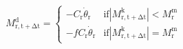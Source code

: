 \documentclass[12pt]{article}
\begin{document}
\begin{align}
 M_\mathrm{r,t+\Delta t}^\mathrm{d} = \left\lbrace \begin{array}{cl}
 -C_\mathrm{r} \dot{\theta}_\mathrm{r} & \mathrm{if } |M_\mathrm{r,t+\Delta t}^\mathrm{k}| < M_\mathrm{r}^\mathrm{m} \\
 -f C_\mathrm{r} \dot{\theta}_\mathrm{r} & \mathrm{if } |M_\mathrm{r,t+\Delta t}^\mathrm{k}| = M_\mathrm{r}^\mathrm{m} \end{array} \right.
\end{align}
\end{document}
